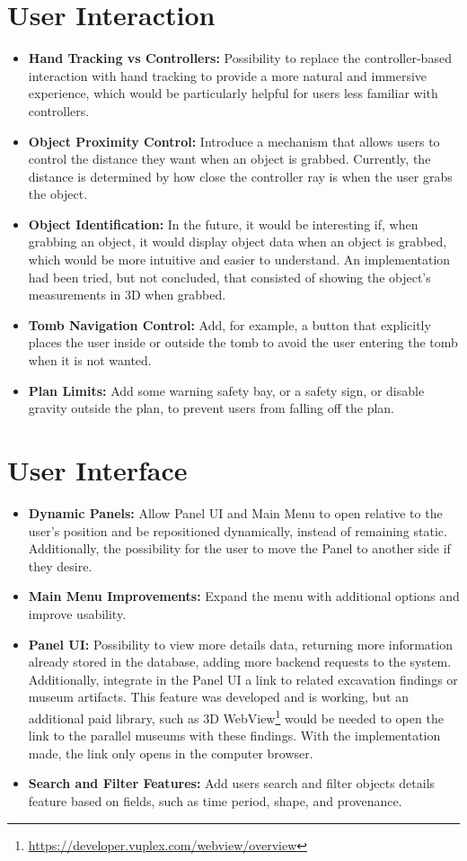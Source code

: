 \section*{User Interaction}
\begin{itemize}
    \item \textbf{Hand Tracking vs Controllers:} Possibility to replace the controller-based interaction with hand tracking to provide a more natural and immersive experience, which would be particularly helpful for users less familiar with controllers.
    \item \textbf{Object Proximity Control:} Introduce a mechanism that allows users to control the distance they want when an object is grabbed. Currently, the distance is determined by how close the controller ray is when the user grabs the object.
    \item \textbf{Object Identification:} In the future, it would be interesting if, when grabbing an object, it would display object data when an object is grabbed, which would be more intuitive and easier to understand. An implementation had been tried, but not concluded, that consisted of showing the object's measurements in \gls{3D} when grabbed.
    \item \textbf{Tomb Navigation Control:} Add, for example, a button that explicitly places the user inside or outside the tomb to avoid the user entering the tomb when it is not wanted.
    \item \textbf{Plan Limits:} Add some warning safety bay, or a safety sign, or disable gravity outside the plan, to prevent users from falling off the plan.
\end{itemize}   

\section*{User Interface}
\begin{itemize}
    \item \textbf{Dynamic Panels:} Allow Panel \gls{UI} and Main Menu to open relative to the user’s position and be repositioned dynamically, instead of remaining static. Additionally, the possibility for the user to move the Panel to another side if they desire.
    \item \textbf{Main Menu Improvements:} Expand the menu with additional options and improve usability.
    \item \textbf{Panel UI:} Possibility to view more details data, returning more information already stored in the database, adding more backend requests to the system. Additionally, integrate in the Panel \gls{UI} a link to related excavation findings or museum artifacts. This feature was developed and is working, but an additional paid library, such as \gls{3D} WebView\footnote{\url{https://developer.vuplex.com/webview/overview}} would be needed to open the link to the parallel museums with these findings. With the implementation made, the link only opens in the computer browser.
    \item \textbf{Search and Filter Features:} Add users search and filter objects details feature based on fields, such as time period, shape, and provenance.
\end{itemize}

